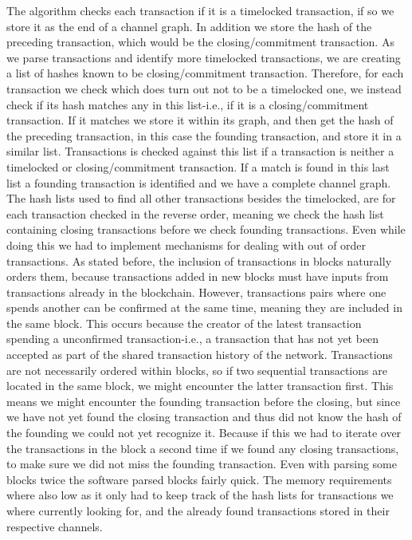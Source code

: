 The algorithm checks each transaction if it is a timelocked transaction, if so we store it as the end of a channel graph. In addition we store the hash of the preceding transaction, which would be the closing/commitment transaction. As we parse transactions and identify more timelocked transactions, we are creating a list of hashes known to be closing/commitment transaction. Therefore, for each transaction we check which does turn out not to be a timelocked one, we instead check if its hash matches any in this list-i.e., if it is a closing/commitment transaction. If it matches we store it within its graph, and then get the hash of the preceding transaction, in this case the founding transaction, and store it in a similar list. 
Transactions is checked against this list if a transaction is neither a timelocked or closing/commitment transaction.
If a match is found in this last list a founding transaction is identified and we have a complete channel graph. 
The hash lists used to find all other transactions besides the timelocked, are for each transaction checked in the reverse order, meaning we check the hash list containing closing transactions before we check founding transactions. Even while doing this we had to implement mechanisms for dealing with out of order transactions. As stated before, the inclusion of transactions in blocks naturally orders them, because 
transactions added in new blocks must have inputs from transactions already in the blockchain. However, transactions pairs where one spends another can be confirmed at the same time, meaning they are included in the same block.
This occurs because the creator of the latest transaction spending a unconfirmed transaction-i.e., a transaction that has not yet been accepted as part of the shared transaction history of the network. 
Transactions are not necessarily ordered within blocks, so if two sequential transactions are located in the same block, we might encounter the latter transaction first. This means we might encounter the founding transaction before the closing, but since we have not yet found the closing transaction and thus did not know the hash of the founding we could not yet recognize it. Because if this we had to iterate over the transactions in the block a second time if we found any closing transactions, to make sure we did not miss the founding transaction.
Even with parsing some blocks twice the software parsed blocks fairly quick. The memory requirements where also low as it only had to keep track of the hash lists for transactions we where currently looking for, and the already found transactions stored in their respective channels. 

